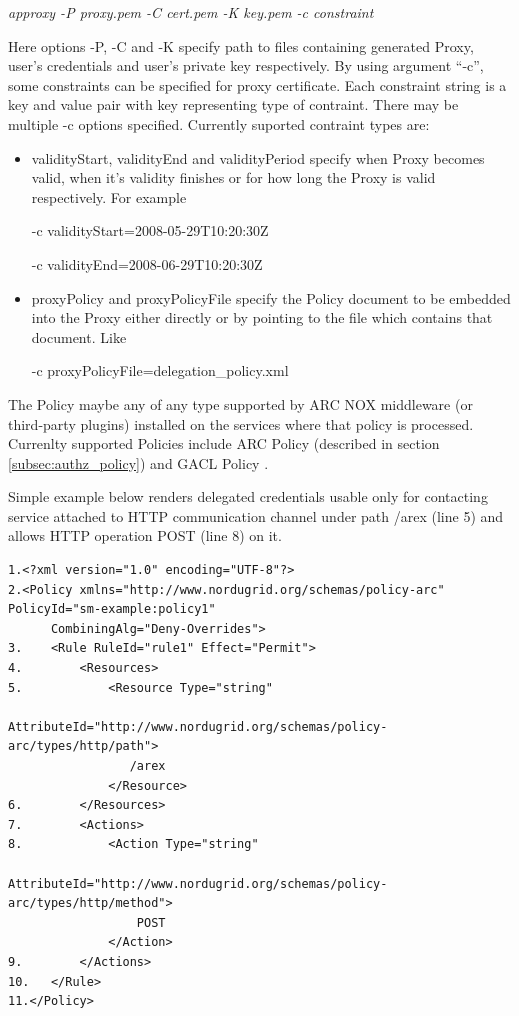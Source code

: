 \documentclass{article}                            %
\begin{document}
\emph{approxy -P proxy.pem -C cert.pem -K key.pem -c constraint}

Here options -P, -C and -K specify path to files containing generated Proxy, user's credentials and user's private key respectively. By using argument ``-c'', some constraints can be specified for proxy certificate. Each constraint string is a key and value pair with key representing type of contraint. There may be multiple -c options specified.  Currently suported contraint types are:

    \begin{itemize}
        \item validityStart, validityEnd and validityPeriod  specify when Proxy becomes valid, when it's validity finishes or for how long the Proxy is valid respectively. For example

-c validityStart=2008-05-29T10:20:30Z

-c validityEnd=2008-06-29T10:20:30Z

        \item proxyPolicy and proxyPolicyFile specify the Policy document to be embedded into the Proxy either directly or by pointing to the file which contains that document. Like

-c proxyPolicyFile=delegation\_policy.xml
    \end{itemize}

The Policy maybe any of any type supported by ARC NOX middleware (or third-party plugins) installed on the services where that policy is processed. Currenlty supported Policies include ARC Policy (described in section \ref{subsec:authz_policy}) and GACL Policy \cite{gacl}.

Simple example below renders delegated credentials usable only for contacting service attached to HTTP communication channel under path /arex (line 5)  and allows HTTP operation POST (line 8) on it.

\begin{verbatim}
1.<?xml version="1.0" encoding="UTF-8"?>
2.<Policy xmlns="http://www.nordugrid.org/schemas/policy-arc" PolicyId="sm-example:policy1"
      CombiningAlg="Deny-Overrides">
3.    <Rule RuleId="rule1" Effect="Permit">
4.        <Resources>
5.            <Resource Type="string"
                  AttributeId="http://www.nordugrid.org/schemas/policy-arc/types/http/path">
                 /arex
              </Resource>
6.        </Resources>
7.        <Actions>
8.            <Action Type="string"
                  AttributeId="http://www.nordugrid.org/schemas/policy-arc/types/http/method">
                  POST
              </Action>
9.        </Actions>
10.   </Rule>
11.</Policy>
\end{verbatim}
\end{document}
